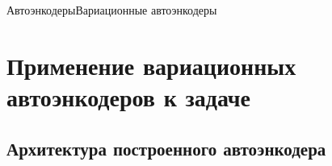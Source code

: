 \documentclass{beamer}
\begin{document}
\begin{frame}{Автоэнкодеры}{Вариационные автоэнкодеры}

\begin{figure}[h]
\label{fig:vae}
\end{figure}

\end{frame}

\section{Применение вариационных автоэнкодеров к задаче}

\subsection{Архитектура построенного автоэнкодера}
\end{document}
